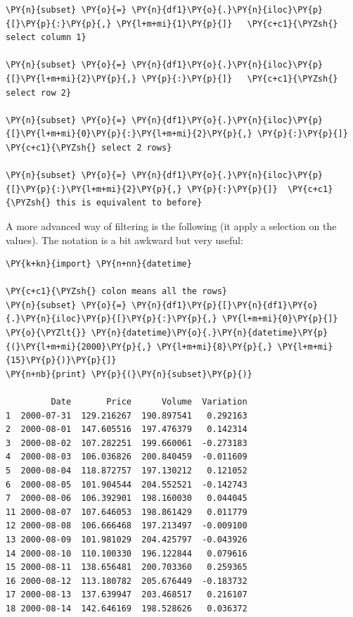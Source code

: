 \begin{tcolorbox}[breakable, size=fbox, boxrule=1pt, pad at break*=1mm,colback=cellbackground, colframe=cellborder]
\begin{Verbatim}[commandchars=\\\{\}]
\PY{n}{subset} \PY{o}{=} \PY{n}{df1}\PY{o}{.}\PY{n}{iloc}\PY{p}{[}\PY{p}{:}\PY{p}{,} \PY{l+m+mi}{1}\PY{p}{]}   \PY{c+c1}{\PYZsh{} select column 1}

\PY{n}{subset} \PY{o}{=} \PY{n}{df1}\PY{o}{.}\PY{n}{iloc}\PY{p}{[}\PY{l+m+mi}{2}\PY{p}{,} \PY{p}{:}\PY{p}{]}   \PY{c+c1}{\PYZsh{} select row 2}

\PY{n}{subset} \PY{o}{=} \PY{n}{df1}\PY{o}{.}\PY{n}{iloc}\PY{p}{[}\PY{l+m+mi}{0}\PY{p}{:}\PY{l+m+mi}{2}\PY{p}{,} \PY{p}{:}\PY{p}{]} \PY{c+c1}{\PYZsh{} select 2 rows}

\PY{n}{subset} \PY{o}{=} \PY{n}{df1}\PY{o}{.}\PY{n}{iloc}\PY{p}{[}\PY{p}{:}\PY{l+m+mi}{2}\PY{p}{,} \PY{p}{:}\PY{p}{]}  \PY{c+c1}{\PYZsh{} this is equivalent to before}
\end{Verbatim}
\end{tcolorbox}

A more advanced way of filtering is the following (it apply a selection on the values). 
The notation is a bit awkward but very useful:

\begin{tcolorbox}[breakable, size=fbox, boxrule=1pt, pad at break*=1mm,colback=cellbackground, colframe=cellborder]
\begin{Verbatim}[commandchars=\\\{\}]
\PY{k+kn}{import} \PY{n+nn}{datetime}

\PY{c+c1}{\PYZsh{} colon means all the rows}
\PY{n}{subset} \PY{o}{=} \PY{n}{df1}\PY{p}{[}\PY{n}{df1}\PY{o}{.}\PY{n}{iloc}\PY{p}{[}\PY{p}{:}\PY{p}{,} \PY{l+m+mi}{0}\PY{p}{]} \PY{o}{\PYZlt{}} \PY{n}{datetime}\PY{o}{.}\PY{n}{datetime}\PY{p}{(}\PY{l+m+mi}{2000}\PY{p}{,} \PY{l+m+mi}{8}\PY{p}{,} \PY{l+m+mi}{15}\PY{p}{)}\PY{p}{]}
\PY{n+nb}{print} \PY{p}{(}\PY{n}{subset}\PY{p}{)}

         Date       Price      Volume  Variation
1  2000-07-31  129.216267  190.897541   0.292163
2  2000-08-01  147.605516  197.476379   0.142314
3  2000-08-02  107.282251  199.660061  -0.273183
4  2000-08-03  106.036826  200.840459  -0.011609
5  2000-08-04  118.872757  197.130212   0.121052
6  2000-08-05  101.904544  204.552521  -0.142743
7  2000-08-06  106.392901  198.160030   0.044045
11 2000-08-07  107.646053  198.861429   0.011779
12 2000-08-08  106.666468  197.213497  -0.009100
13 2000-08-09  101.981029  204.425797  -0.043926
14 2000-08-10  110.100330  196.122844   0.079616
15 2000-08-11  138.656481  200.703360   0.259365
16 2000-08-12  113.180782  205.676449  -0.183732
17 2000-08-13  137.639947  203.468517   0.216107
18 2000-08-14  142.646169  198.528626   0.036372
\end{Verbatim}
\end{tcolorbox}


